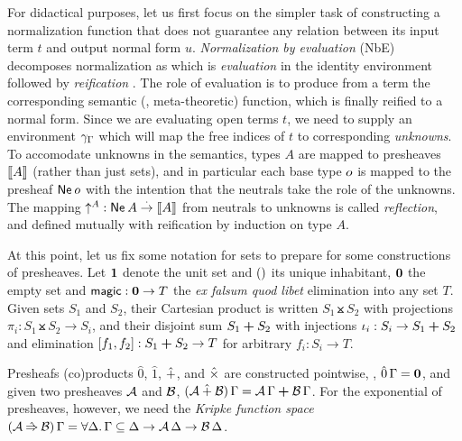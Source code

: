 \documentclass[a4paper,USenglish,cleveref, autoref]{lipics-v2019}
\begin{document}
For didactical purposes, let us first focus on the simpler task of
constructing a normalization function
that does not guarantee any relation between its input term $t$ and
output normal form $u$.
\emph{Normalization by evaluation} (NbE) decomposes normalization as
which is
\emph{evaluation}
in the identity environment \nofbox{$\idenv\Gamma : \den \Gamma \Gamma$}
followed by
\emph{reification}
.
The role of evaluation is to produce from a term the corresponding
semantic (\ie, meta-theoretic) function, which is finally reified to a normal form.
Since we are evaluating open terms $t$, we need to supply an environment
$\gamma_{\Gamma}$ which will map the free indices of $t$ to corresponding
\emph{unknowns}.  To accomodate unknowns in the semantics, types $A$
are mapped to presheaves $\mathopen{{[\kern-0.14em[}} A \mathclose{{]\kern-0.14em]}}$ (rather than just sets), and in
particular each base type $o$ is mapped to the presheaf
$\mathsf{Ne}^{}\,o$ with the intention that the neutrals take the role of
the unknowns.  The mapping $\mathord{\uparrow_{}^{A}} : \mathsf{Ne}^{}\,A \stackrel{\cdot}{\to} \mathopen{{[\kern-0.14em[}} A \mathclose{{]\kern-0.14em]}}$ from
neutrals to unknowns is called \emph{reflection}, and defined mutually
with reification by induction on type $A$.

At this point, let us fix some notation for sets to prepare for some
constructions of presheaves.  Let $\mbox{\textbf{1}}$ denote the unit set and
$()$ its unique inhabitant, $\mbox{\textbf{0}}$ the empty set and
$\mathsf{magic} : \mbox{\textbf{0}} \to T$ the \emph{ex falsum quod libet} elimination
into any set $T$.  Given sets $S_1$ and $S_2$, their Cartesian product
is written $S_1 \btimes S_2$ with projections $\pi_i : S_1 \btimes S_2
\to S_i$, and their disjoint sum $S_1 \boldsymbol{+} S_2$ with injections
$\iota_i : S_i \to S_1 \boldsymbol{+} S_2$ and elimination $[f_1,f_2] : S_1 \boldsymbol{+}
S_2 \to T$ for arbitrary $f_i : S_i \to T$.

Presheafs (co)products $\hat0$, $\hat1$, $\mathbin{\hat+}$, and $\mathbin{\hat\times}$ are
constructed pointwise, \eg, $\hat0\,\Gamma = \mbox{\textbf{0}}$, and given two
presheaves $\mathcal{A}$ and $\mathcal{B}$,
$(\mathcal{A} \mathbin{\hat+} \mathcal{B})\,\Gamma = \mathcal{A}\,\Gamma \boldsymbol{+} \mathcal{B}\,\Gamma$.  For the
exponential of presheaves, however, we need the \emph{Kripke function
  space}
$(\mathcal{A} \mathbin{\hat{\Rightarrow}} \mathcal{B})\,\Gamma = \forall \Delta.\, \Gamma \subseteq \Delta
\to \mathcal{A}\,\Delta \to \mathcal{B}\,\Delta$.
\end{document}
